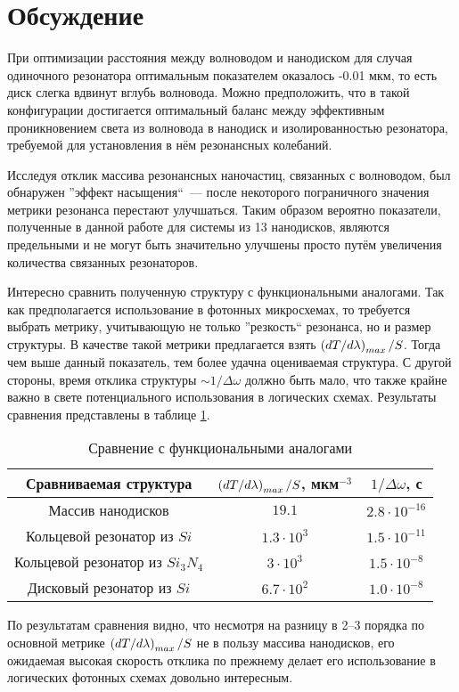 \section{Обсуждение}

При оптимизации расстояния между волноводом и нанодиском для случая одиночного резонатора оптимальным показателем оказалось -0.01 мкм, то есть диск слегка вдвинут вглубь волновода. Можно предположить, что в такой конфигурации достигается оптимальный баланс между эффективным проникновением света из волновода в нанодиск и изолированностью резонатора, требуемой для установления в нём резонансных колебаний.

Исследуя отклик массива резонансных наночастиц, связанных с волноводом, был обнаружен ''эффект насыщения``~--- после некоторого пограничного значения метрики резонанса перестают улучшаться. Таким образом вероятно показатели, полученные в данной работе для системы из 13 нанодисков, являются предельными и не могут быть значительно улучшены просто путём увеличения количества связанных резонаторов.

Интересно сравнить полученную структуру с функциональными аналогами. Так как предполагается использование в фотонных микросхемах, то требуется выбрать метрику, учитывающую не только ''резкость`` резонанса, но и размер структуры. В качестве такой метрики предлагается взять $\left( dT/d\lambda \right)_{max}/S$. Тогда чем выше данный показатель, тем более удачна оцениваемая структура. С другой стороны, время отклика структуры $\sim 1/\Delta \omega$ должно быть мало, что также крайне важно в свете потенциального использования в логических схемах. Результаты сравнения представлены в таблице \ref{tbl:functional_compare}.

\begin{table}[H]
	\centering
	\begin{tabular}{|c|c|c|}
		\hline
		Сравниваемая структура & $\left( dT/d\lambda \right)_{max}/S$, мкм$^{-3}$ & $1/\Delta \omega$, с \\
		\hline
		Массив нанодисков & $19.1$ & $2.8 \cdot 10^{-16}$\\
		\hline
		Кольцевой резонатор из $Si$ \cite{Vilson2004} & $1.3 \cdot 10^3$ & $1.5 \cdot 10^{-11}$\\
		\hline
		Кольцевой резонатор из $Si_3 N_4$ \cite{Gondarenko2009} & $3 \cdot 10^3$ & $1.5 \cdot 10^{-8}$\\
		\hline
		Дисковый резонатор из $Si$ \cite{Soltani2007} & $6.7 \cdot 10^2$ & $1.0 \cdot 10^{-8}$\\
		\hline
	\end{tabular}
	\caption{Сравнение с функциональными аналогами}
	\label{tbl:functional_compare}
\end{table}

По результатам сравнения видно, что несмотря на разницу в 2--3 порядка по основной метрике $\left( dT/d\lambda \right)_{max}/S$ не в пользу массива нанодисков, его ожидаемая высокая скорость отклика по прежнему делает его использование в логических фотонных схемах довольно интересным.